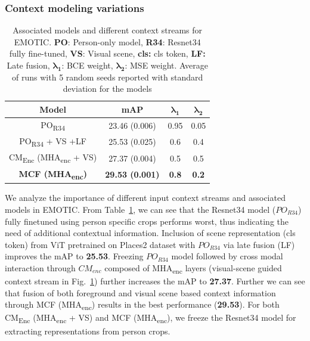 \subsubsection{Context modeling variations}
\begin{table}[h!]
\centering
\begin{tabular}{|c|c|c|c|}
\hline
\textbf{Model}                      & \textbf{mAP}            & $\mathbf{\lambda_{1}}$ & $\mathbf{\lambda_{2}}$ \\ \hline
PO\textsubscript{R34}                  & 23.46 (0.006)           & 0.95                   & 0.05               \\ \hline
PO\textsubscript{R34} + VS +LF & 25.53 (0.025)           & 0.6                    & 0.4                \\ \hline
CM\textsubscript{Enc} (MHA\textsubscript{enc} + VS)        & 27.37 (0.004)           & 0.5                    & 0.5                \\ \hline
\textbf{MCF (MHA\textsubscript{enc})}               & \textbf{29.53 (0.001)} & \textbf{0.8}           & \textbf{0.2}       \\ \hline
\end{tabular}
\caption{Associated models and different context streams for EMOTIC. \textbf{PO}: Person-only model, \textbf{R34}: Resnet34 fully fine-tuned, \textbf{VS}: Visual scene, \textbf{cls:} cls token, \textbf{LF:} Late fusion, $\mathbf{\lambda_{1}}$: BCE weight, $\mathbf{\lambda_{2}}$: MSE weight. Average of runs with 5 random seeds reported with standard deviation for the models}
\label{ablationemotic}
\end{table}
We analyze the importance of different input context streams and associated models in EMOTIC. From Table~\ref{ablationemotic}, we can see that the Resnet34 model ($PO_{R34}$) fully finetuned using person specific crops performs worst, thus indicating the need of additional contextual information. Inclusion of scene representation (cls token) from ViT pretrained on Places2 dataset with $PO_{R34}$ via late fusion (LF) improves the mAP to \textbf{25.53}. Freezing $PO_{R34}$ model followed by cross modal interaction through $CM_{enc}$ composed of MHA\textsubscript{enc} layers (visual-scene guided context stream in Fig.~\ref{ablationemotic}) further increases the mAP to \textbf{27.37}. Further we can see that fusion of both foreground and visual scene based context information through MCF (MHA\textsubscript{enc}) results in the best performance (\textbf{29.53}). For both CM\textsubscript{Enc} (MHA\textsubscript{enc} + VS) and MCF (MHA\textsubscript{enc}), we freeze the Resnet34 model for extracting representations from person crops. 

